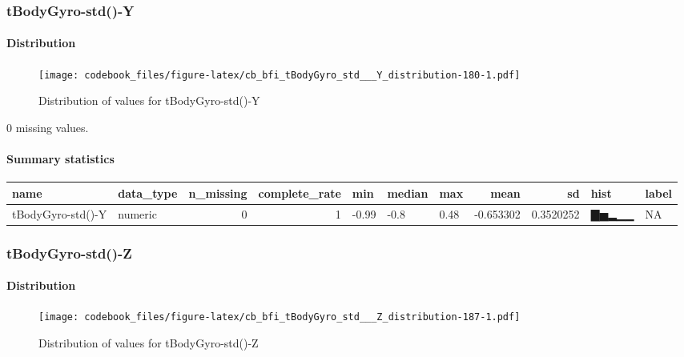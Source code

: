\documentclass[
]{article}
\begin{document}
\hypertarget{tBodyGyro_std___Y}{%
\subsubsection{tBodyGyro-std()-Y}\label{tBodyGyro_std___Y}}

\hypertarget{tBodyGyro_std___Y_distribution}{%
\paragraph{Distribution}\label{tBodyGyro_std___Y_distribution}}

\begin{figure}
\centering
\texttt{[image: codebook\_files/figure-latex/cb\_bfi\_tBodyGyro\_std\_\_\_Y\_distribution-180-1.pdf]}
\caption{Distribution of values for tBodyGyro-std()-Y}
\end{figure}

0 missing values.

\hypertarget{tBodyGyro_std___Y_summary}{%
\paragraph{Summary statistics}\label{tBodyGyro_std___Y_summary}}

\begin{longtable}[]{@{}llrrlllrrll@{}}
\toprule
name & data\_type & n\_missing & complete\_rate & min & median & max &
mean & sd & hist & label \\
\midrule
\endhead
tBodyGyro-std()-Y & numeric & 0 & 1 & -0.99 & -0.8 & 0.48 & -0.653302 &
0.3520252 & ▇▅▂▁▁ & NA \\
\bottomrule
\end{longtable}

\hypertarget{tBodyGyro_std___Z}{%
\subsubsection{tBodyGyro-std()-Z}\label{tBodyGyro_std___Z}}

\hypertarget{tBodyGyro_std___Z_distribution}{%
\paragraph{Distribution}\label{tBodyGyro_std___Z_distribution}}

\begin{figure}
\centering
\texttt{[image: codebook\_files/figure-latex/cb\_bfi\_tBodyGyro\_std\_\_\_Z\_distribution-187-1.pdf]}
\caption{Distribution of values for tBodyGyro-std()-Z}
\end{figure}
\end{document}
